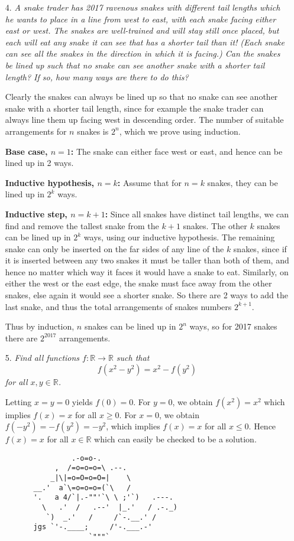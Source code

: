 \documentclass[12pt]{article}
\begin{document}
\begin{enumerate}
\item[4.] \emph{A snake trader has 2017 ravenous snakes with different tail lengths which he wants to place in a line from west to east, with each snake facing either east or west. The snakes are well-trained and will stay still once placed, but each will eat any snake it can see that has a shorter tail than it! (Each snake can see all the snakes in the direction in which it is facing.) Can the snakes be lined up such that no snake can see another snake with a shorter tail length? If so, how many ways are there to do this?}

Clearly the snakes can always be lined up so that no snake can see another snake with a shorter tail length, since for example the snake trader can always line them up facing west in descending order. The number of suitable arrangements for $n$ snakes is $2^n$, which we prove using induction.

\textbf{Base case, $n =1$:} The snake can either face west or east, and hence can be lined up in 2 ways.

\textbf{Inductive hypothesis, $n=k$:} Assume that for $n=k$ snakes, they can be lined up in $2^k$ ways.

\textbf{Inductive step, $n=k+1$:} Since all snakes have distinct tail lengths, we can find and remove the tallest snake from the $k+1$ snakes. The other $k$ snakes can be lined up in $2^k$ ways, using our inductive hypothesis. The remaining snake can only be inserted on the far sides of any line of the $k$ snakes, since if it is inserted between any two snakes it must be taller than both of them, and hence no matter which way it faces it would have a snake to eat. Similarly, on either the west or the east edge, the snake must face away from the other snakes, else again it would see a shorter snake. So there are 2 ways to add the last snake, and thus the total arrangements of snakes numbers $2^{k+1}$.

Thus by induction, $n$ snakes can be lined up in $2^n$ ways, so for 2017 snakes there are $2^{2017}$ arrangements.


\item[5.] \emph{Find all functions $f : \mathbb{R} \to \mathbb{R}$ such that
	\[f(x^2-y^2) = x^2 - f(y^2)\]
for all $x,y \in \mathbb{R}$.}

Letting $x = y = 0$ yields $f(0) = 0$. For $y = 0$, we obtain $f(x^2) = x^2$ which implies $f(x) = x$ for all $x \geq 0$. For $x = 0$, we obtain $f(-y^2) = -f(y^2) = -y^2$, which implies $f(x) = x$ for all $x \leq 0$. Hence $f(x) = x$ for all $x \in \mathbb{R}$ which can easily be checked to be a solution.

\end{enumerate}


\centering \begin{BVerbatim}
                   .-o=o-.
               ,  /=o=o=o=\ .--.
              _|\|=o=O=o=O=|    \
          __.'  a`\=o=o=o=(`\   /
          '.   a 4/`|.-""'`\ \ ;'`)   .---.
            \   .'  /   .--'  |_.'   / .-._)
             `)  _.'   /     /`-.__.' /
          jgs `'-.____;     /'-.___.-'
                       `"""`
\end{BVerbatim}
\end{document}
